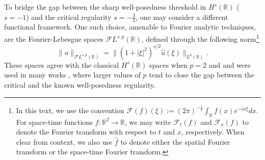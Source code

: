 \documentclass[%
11pt,  reqno]{amsart}
\newcommand{\5}{\textup{V}}
\newcommand{\FL}{\mathcal{F} L}
\newcommand{\ft}{\widehat}
\theoremstyle{remark}
\newcommand{\R}{\mathbb{R}}
\newcommand{\Ft}{{\mathcal{F}}}
\numberwithin{equation}{section}
\numberwithin{theorem}{section}
\begin{document}




\medskip


To bridge the gap between the sharp well-posedness threshold in $H^s(\R)$ ($s=-1$) and the critical regularity $s=-\frac32$, one may consider a different functional framework. 
One such choice, amenable to Fourier analytic techniques, are the Fourier-Lebesgue spaces $\FL^{s,p}(\R)$, defined through the following norm\footnote{
In this text, we use the convention
$
 \Ft(f)(\xi) := (2\pi)^{-\frac12} \int_\R f(x) e^{-i x \xi} dx. 
$
For space-time functions $f: \R^2 \to \R$, we may write $\Ft_t (f)$ and $\Ft_x(f)$ to denote the Fourier transform with respect to $t$ and $x$, respectively. When clear from context, we also use $\ft{f}$ to denote either the spatial Fourier transform or the space-time Fourier transform. }
	\begin{equation}
		\|u \|_{\FL^{s,p}(\R)}=\|(1+|\xi|^2)^{s/2}\ft{u  }(\xi)\|_{L^p(\R)}.
	\end{equation} 
These spaces agree with the classical $H^s(\R)$ spaces when $p=2$ and
and were used in many works \cite{adams, BO94, Chapouto_FL_mkdv, Christ_power,CC24,Grunrock_mkdv, Grunrock_ldv_hier, HerrGrunrock_FL,  GrunrockVega}, where larger values of $p$ tend to close the gap between the critical and the known well-posedness regularity. 
\end{document}
